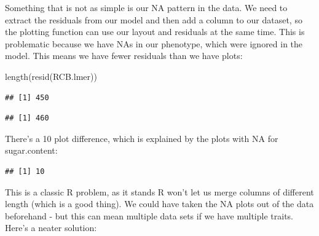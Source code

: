 \documentclass[
]{book}
\newenvironment{Shaded}{\begin{snugshade}}{\end{snugshade}}
\newcommand{\FunctionTok}[1]{\textcolor[rgb]{0.00,0.00,0.00}{#1}}
\newcommand{\NormalTok}[1]{#1}
\newcommand{\SpecialCharTok}[1]{\textcolor[rgb]{0.00,0.00,0.00}{#1}}
\begin{document}
Something that is not as simple is our NA pattern in the data. We need to extract the residuals from our model and then add a column to our dataset, so the plotting function can use our layout and residuals at the same time. This is problematic because we have NAs in our phenotype, which were ignored in the model. This means we have fewer residuals than we have plots:

\begin{Shaded}
\begin{Highlighting}[]
\FunctionTok{length}\NormalTok{(}\FunctionTok{resid}\NormalTok{(RCB.lmer))}
\end{Highlighting}
\end{Shaded}

\begin{verbatim}
## [1] 450
\end{verbatim}

\begin{Shaded}
\end{Shaded}

\begin{verbatim}
## [1] 460
\end{verbatim}

There's a 10 plot difference, which is explained by the plots with NA for sugar.content:

\begin{Shaded}
\end{Shaded}

\begin{verbatim}
## [1] 10
\end{verbatim}

This is a classic R problem, as it stands R won't let us merge columns of different length (which is a good thing). We could have taken the NA plots out of the data beforehand - but this can mean multiple data sets if we have multiple traits. Here's a neater solution:
\end{document}

